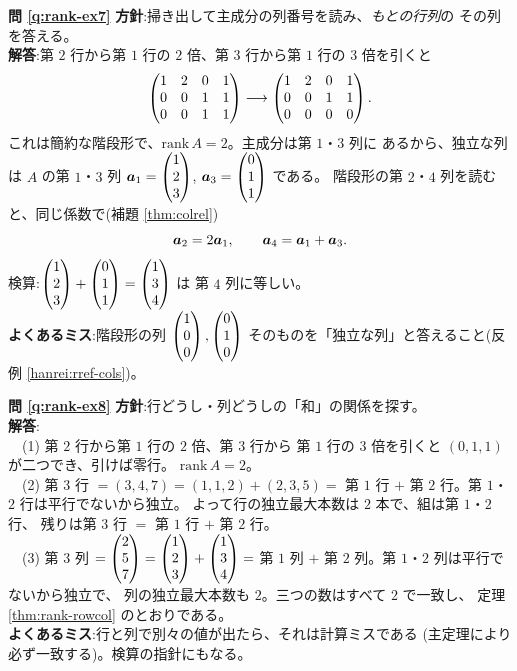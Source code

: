 \bigskip
\noindent\textbf{問 \ref{q:rank-ex7}}\quad
\textbf{方針}:掃き出して主成分の列番号を読み、\emph{もとの行列}の
その列を答える。\\
\textbf{解答}:第 $2$ 行から第 $1$ 行の $2$ 倍、第 $3$ 行から第 $1$ 行の
$3$ 倍を引くと
\[
\begin{pmatrix}1 & 2 & 0 & 1 \\ 0 & 0 & 1 & 1 \\ 0 & 0 & 1 & 1\end{pmatrix}
\longrightarrow
\begin{pmatrix}1 & 2 & 0 & 1 \\ 0 & 0 & 1 & 1 \\ 0 & 0 & 0 & 0\end{pmatrix}.
\]
これは簡約な階段形で、$\mathrm{rank}\,A = 2$。主成分は第 $1$・$3$ 列に
あるから、独立な列は $A$ の第 $1$・$3$ 列
$\bm{a}_1 = \begin{pmatrix}1 \\ 2 \\ 3\end{pmatrix}$, $\bm{a}_3 = \begin{pmatrix}0 \\ 1 \\ 1\end{pmatrix}$ である。
階段形の第 $2$・$4$ 列を読むと、同じ係数で(補題 \ref{thm:colrel})
\[
\bm{a}_2 = 2\bm{a}_1, \qquad \bm{a}_4 = \bm{a}_1 + \bm{a}_3.
\]
検算:$\begin{pmatrix}1 \\ 2 \\ 3\end{pmatrix} + \begin{pmatrix}0 \\ 1 \\ 1\end{pmatrix} = \begin{pmatrix}1 \\ 3 \\ 4\end{pmatrix}$ は
第 $4$ 列に等しい。\\
\textbf{よくあるミス}:階段形の列 $\begin{pmatrix}1 \\ 0 \\ 0\end{pmatrix}, \begin{pmatrix}0 \\ 1 \\ 0\end{pmatrix}$
そのものを「独立な列」と答えること(反例 \ref{hanrei:rref-cols})。

\bigskip
\noindent\textbf{問 \ref{q:rank-ex8}}\quad
\textbf{方針}:行どうし・列どうしの「和」の関係を探す。\\
\textbf{解答}:\\
　(1) 第 $2$ 行から第 $1$ 行の $2$ 倍、第 $3$ 行から
第 $1$ 行の $3$ 倍を引くと $(0, 1, 1)$ が二つでき、引けば零行。
$\mathrm{rank}\,A = 2$。\\
　(2) 第 $3$ 行 $= (3, 4, 7) = (1, 1, 2) + (2, 3, 5) =$
第 $1$ 行 $+$ 第 $2$ 行。第 $1$・$2$ 行は平行でないから独立。
よって行の独立最大本数は $2$ 本で、組は第 $1$・$2$ 行、
残りは第 $3$ 行 $=$ 第 $1$ 行 $+$ 第 $2$ 行。\\
　(3) 第 $3$ 列 $= \begin{pmatrix}2 \\ 5 \\ 7\end{pmatrix} = \begin{pmatrix}1 \\ 2 \\ 3\end{pmatrix} + \begin{pmatrix}1 \\ 3 \\ 4\end{pmatrix}
=$ 第 $1$ 列 $+$ 第 $2$ 列。第 $1$・$2$ 列は平行でないから独立で、
列の独立最大本数も $2$。三つの数はすべて $2$ で一致し、
定理 \ref{thm:rank-rowcol} のとおりである。\\
\textbf{よくあるミス}:行と列で別々の値が出たら、それは計算ミスである
(主定理により必ず一致する)。検算の指針にもなる。

